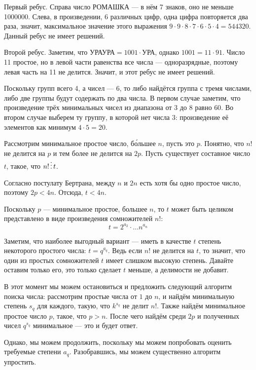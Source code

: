 \begin{itemize}
\itA Первый ребус. Справа число РОМАШКА --- в нём 7 знаков, оно не меньше 1000000.
Слева, в произведении, 6 различных цифр, одна цифра повторяется два раза, значит, максимальное
значение этого выражения $9\cdot 9 \cdot 8 \cdot 7 \cdot 6 \cdot 5 \cdot 4 = 544320$.
Данный ребус не имеет решений.

Второй ребус. Заметим, что $\text{УРАУРА} = 1001 \cdot \text{УРА}$, однако $1001 = 11 \cdot 91$.
Число 11 простое, но в левой части равенства все числа --- одноразрядные, поэтому левая часть
на 11 не делится. Значит, и этот ребус не имеет решений.

\itB Поскольку групп всего 4, а чисел --- 6, то либо найдётся группа с тремя числами, либо две
группы будут содержать по два числа. В первом случае заметим, что произведение трёх минимальных
чисел из диапазона от 3 до 8 равно $60$. Во втором случае выберем ту группу, в которой нет 
числа 3: произведение её элементов как минимум $4 \cdot 5 = 20$.

\itC Рассмотрим минимальное простое число, б\'ольшее $n$, пусть это $p$.
Понятно, что $n!$ не делится на $p$ и тем более не делится на $2p$. 
Пусть существует составное число $t$, такое, что $n! \mathop{\vdots} t$.

Согласно постулату Бертрана, между $n$ и $2n$ есть хотя бы одно простое число,
поэтому $2p < 4n$. Отсюда, $t < 4n$. 

Поскольку $p$ --- минимальное простое, большее $n$, то $t$ может быть целиком
представлено в виде произведения сомножителей $n!$: 
$$t = 2^{a_2} \cdot \ldots n^{a_n}$$

Заметим, что наиболее выгодный вариант --- иметь в качестве $t$ степень некоторого
простого числа: $t = q^{a_q}$. Ведь если $n!$ не делится на $t$, то значит, что один
из простых сомножителей $t$ имеет слишком высокую степень. Давайте оставим только его,
это только сделает $t$ меньше, а делимости не добавит.

В этот момент мы можем остановиться и предложить следующий алгоритм поиска 
числа: рассмотрим простые числа от $1$ до $n$, и найдём минимальную степень 
$s_q$ для каждого, такую, что $k^{s_q}$ не делит $n!$. Также найдём минимальное
простое число $p$, такое, что $p > n$. После чего найдём среди $2p$ и полученных
чисел $q^{s_q}$ минимальное --- это и будет ответ.

Однако, мы можем продолжить, поскольку мы можем попробовать оценить требуемые
степени $a_q$. Разобравшись, мы можем существенно алгоритм упростить.


\end{itemize}
